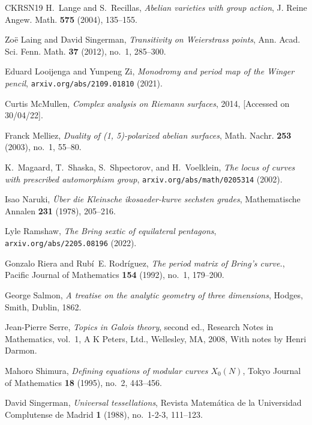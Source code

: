 \documentclass{amsart}
\begin{document}
\begin{thebibliography}{CKRSN19}
H.~Lange and S.~Recillas, \emph{Abelian varieties with group action}, J. Reine
  Angew. Math. \textbf{575} (2004), 135--155.

Zo{\"e} Laing and David Singerman, \emph{Transitivity on {W}eierstrass points},
  Ann. Acad. Sci. Fenn. Math. \textbf{37} (2012), no.~1, 285--300.

Eduard Looijenga and Yunpeng Zi, \emph{Monodromy and period map of the {W}inger
  pencil}, {\tt arxiv.org/abs/2109.01810} (2021).

Curtis McMullen, \emph{Complex analysis on {R}iemann surfaces}, 2014, [Accessed
  on 30/04/22].

Franck Melliez, \emph{Duality of (1, 5)-polarized abelian surfaces}, Math.
  Nachr. \textbf{253} (2003), no.~1, 55--80.

K.~Magaard, T.~Shaska, S.~Shpectorov, and H.~Voelklein, \emph{The locus of
  curves with prescribed automorphism group}, {\tt arxiv.org/abs/math/0205314}
  (2002).

Isao Naruki, \emph{{\"U}ber die {K}leinsche ikosaeder-kurve sechsten grades},
  Mathematische Annalen \textbf{231} (1978), 205--216.

Lyle Ramshaw, \emph{The {B}ring sextic of equilateral pentagons}, {\tt
  arxiv.org/abs/2205.08196} (2022).

Gonzalo Riera and Rubí~E. Rodríguez, \emph{The period matrix of {B}ring's
  curve.}, Pacific Journal of Mathematics \textbf{154} (1992), no.~1, 179--200.

George Salmon, \emph{A treatise on the analytic geometry of three dimensions},
  Hodges, Smith, Dublin, 1862.

Jean-Pierre Serre, \emph{Topics in {G}alois theory}, second ed., Research Notes
  in Mathematics, vol.~1, A K Peters, Ltd., Wellesley, MA, 2008, With notes by
  Henri Darmon.

Mahoro Shimura, \emph{Defining equations of modular curves {$X_0(N)$}}, Tokyo
  Journal of Mathematics \textbf{18} (1995), no.~2, 443--456.

David Singerman, \emph{Universal tessellations}, Revista Matemática de la
  Universidad Complutense de Madrid \textbf{1} (1988), no.~1-2-3, 111--123.


\end{thebibliography}
\end{document}
